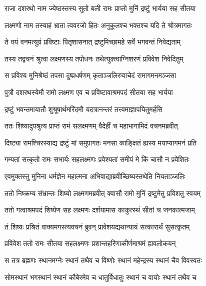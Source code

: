 \twolineshloka
{राजा दशरथो नाम ज्येष्ठस्तस्य सुतो बली}
{रामः प्राप्तो मुनिं द्रष्टुं भार्यया सह सीतया} %

\twolineshloka
{लक्ष्मणो नाम तस्याहं भ्राता त्ववरजो हितः}
{अनुकूलश्च भक्तश्च यदि ते श्रोत्रमागतः} %

\twolineshloka
{ते वयं वनमत्युग्रं प्रविष्टाः पितृशासनात्}
{द्रष्टुमिच्छामहे सर्वे भगवन्तं निवेद्यताम्} %

\twolineshloka
{तस्य तद्वचनं श्रुत्वा लक्ष्मणस्य तपोधनः}
{तथेत्युक्त्वाग्निशरणं प्रविवेश निवेदितुम्} %

\twolineshloka
{स प्रविश्य मुनिश्रेष्ठं तपसा दुष्प्रधर्षणम्}
{कृताञ्जलिरुवाचेदं रामागमनमञ्जसा} %

\twolineshloka
{पुत्रौ दशरथस्येमौ रामो लक्ष्मण एव च}
{प्रविष्टावाश्रमपदं सीतया सह भार्यया} %

\twolineshloka
{द्रष्टुं भवन्तमायातौ शुश्रूषार्थमरिंदमौ}
{यदत्रानन्तरं तत्त्वमाज्ञापयितुमर्हसि} %

\twolineshloka
{ततः शिष्यादुपश्रुत्य प्राप्तं रामं सलक्ष्मणम्}
{वैदेहीं च महाभागामिदं वचनमब्रवीत्} %

\twolineshloka
{दिष्ट्या रामश्चिरस्याद्य द्रष्टुं मां समुपागतः}
{मनसा काङ्क्षितं ह्यस्य मयाप्यागमनं प्रति} %

\twolineshloka
{गम्यतां सत्कृतो रामः सभार्यः सहलक्ष्मणः}
{प्रवेश्यतां समीपं मे किं चासौ न प्रवेशितः} %

\twolineshloka
{एवमुक्तस्तु मुनिना धर्मज्ञेन महात्मना}
{अभिवाद्याब्रवीच्छिष्यस्तथेति नियताञ्जलिः} %

\twolineshloka
{ततो निष्क्रम्य संभ्रान्तः शिष्यो लक्ष्मणमब्रवीत्}
{क्वासौ रामो मुनिं द्रष्टुमेतु प्रविशतु स्वयम्} %

\twolineshloka
{ततो गत्वाश्रमपदं शिष्येण सह लक्ष्मणः}
{दर्शयामास काकुत्स्थं सीतां च जनकात्मजाम्} %

\twolineshloka
{तं शिष्यः प्रश्रितं वाक्यमगस्त्यवचनं ब्रुवन्}
{प्रावेशयद्यथान्यायं सत्कारार्थं सुसत्कृतम्} %

\twolineshloka
{प्रविवेश ततो रामः सीतया सहलक्ष्मणः}
{प्रशान्तहरिणाकीर्णमाश्रमं ह्यवलोकयन्} %

\twolineshloka
{स तत्र ब्रह्मणः स्थानमग्नेः स्थानं तथैव च}
{विष्णोः स्थानं महेन्द्रस्य स्थानं चैव विवस्वतः} %

\twolineshloka
{सोमस्थानं भगस्थानं स्थानं कौबेरमेव च}
{धातुर्विधातुः स्थानं च वायोः स्थानं तथैव च} %

